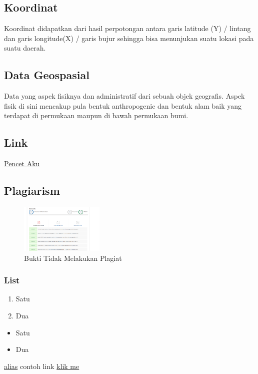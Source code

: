 \subsection{Koordinat}
Koordinat didapatkan dari hasil perpotongan antara garis latitude (Y) / lintang dan garis longitude(X) / garis bujur sehingga bisa menunjukan suatu lokasi pada suatu daerah.
\subsection{Data Geospasial}
Data yang aspek fisiknya dan administratif dari sebuah objek geografis. Aspek fisik di sini mencakup pula bentuk anthropogenic dan bentuk alam baik yang terdapat di permukaan maupun di bawah permukaan bumi. 
\subsection{Link}
\href{https://youtu.be/eby2SXgrvbU}{Pencet Aku}
\subsection{Plagiarism}
\begin{figure}[H]
	\includegraphics[width=4cm]{figures/1174051/1/1.png}
	\centering
	\caption{Bukti Tidak Melakukan Plagiat}
\end{figure}

\subsubsection{List}
\begin{enumerate}
	\item Satu
	\item Dua
\end{enumerate}

\begin{itemize}
	\item Satu
	\item Dua
\end{itemize}

\href{link kamu}{alias}
contoh link
\href{https://www.google.com/}{klik me}